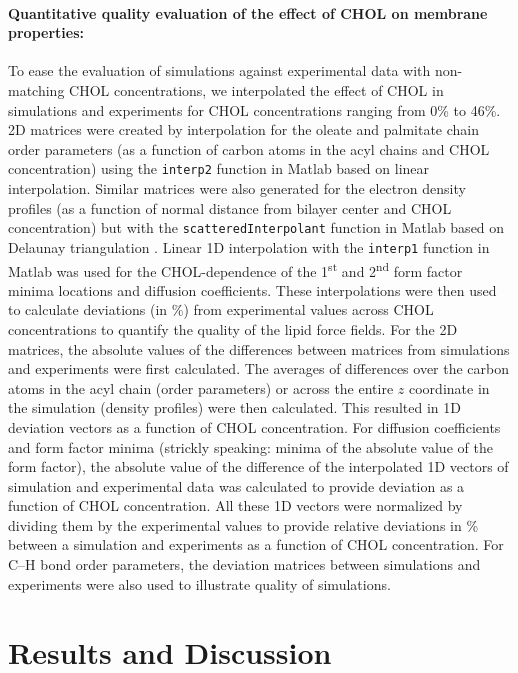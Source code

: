 \documentclass[journal=jctcce]{achemso}
\begin{document}
\paragraph{Quantitative quality evaluation of the effect of CHOL on membrane properties:} To ease the evaluation of simulations against experimental data with non-matching CHOL concentrations, we interpolated the effect of CHOL in simulations and experiments for CHOL concentrations ranging from 0\% to 46\%. 2D matrices were created by interpolation for the oleate and palmitate chain order parameters (as a function of carbon atoms in the acyl chains and CHOL concentration) using the \texttt{interp2} function in Matlab based on linear interpolation. Similar matrices were also generated for the electron density profiles (as a function of normal distance from bilayer center and CHOL concentration) but with the \texttt{scatteredInterpolant} function in Matlab based on Delaunay triangulation \cite{amidror2002scattered}. Linear 1D interpolation with the \texttt{interp1} function in Matlab was used for the CHOL-dependence of the 1\textsuperscript{st} and 2\textsuperscript{nd} form factor minima locations and diffusion coefficients. These interpolations were then used to calculate deviations (in \%) from experimental values across CHOL concentrations to quantify the quality of the lipid force fields.  For the 2D matrices, the absolute values of the differences between matrices from simulations and experiments were first calculated. The averages of differences over the carbon atoms in the acyl chain (order parameters) or across the entire $z$ coordinate in the simulation (density profiles) were then calculated. This resulted in 1D deviation vectors as a function of CHOL concentration. For diffusion coefficients and form factor minima (strickly speaking: minima of the absolute value of the form factor), the absolute value of the difference of the interpolated 1D vectors of simulation and experimental data was calculated to provide deviation as a function of CHOL concentration. All these 1D vectors were normalized by dividing them by the experimental values to provide relative deviations in \% between a simulation and experiments as a function of CHOL concentration. For C--H bond order parameters, the deviation matrices between simulations and experiments were also used to illustrate quality of simulations.


\section{Results and Discussion}
\end{document}

